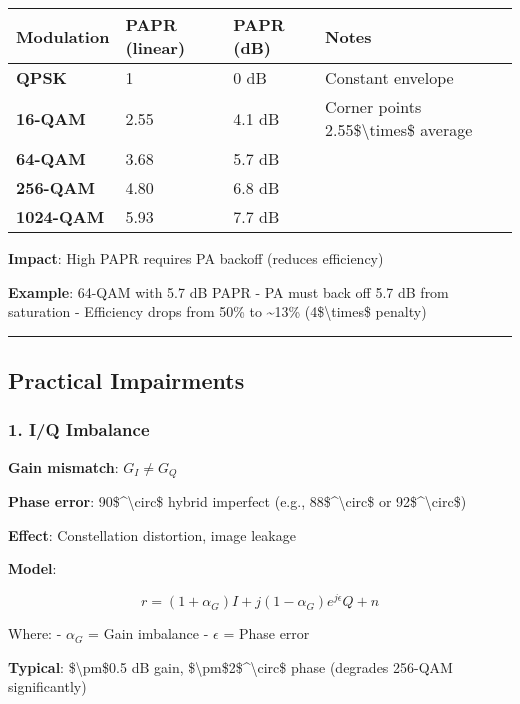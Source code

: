 {\def\LTcaptype{} %
\begin{longtable}[]{@{}llll@{}}
\toprule\noalign{}
Modulation & PAPR (linear) & PAPR (dB) & Notes \\
\midrule\noalign{}
\endhead
\bottomrule\noalign{}
\endlastfoot
\textbf{QPSK} & 1 & 0 dB & Constant envelope \\
\textbf{16-QAM} & 2.55 & 4.1 dB & Corner points
2.55\$\textbackslash times\$ average \\
\textbf{64-QAM} & 3.68 & 5.7 dB & \\
\textbf{256-QAM} & 4.80 & 6.8 dB & \\
\textbf{1024-QAM} & 5.93 & 7.7 dB & \\
\end{longtable}
}

\textbf{Impact}: High PAPR requires PA backoff (reduces efficiency)

\textbf{Example}: 64-QAM with 5.7 dB PAPR - PA must back off 5.7 dB from
saturation - Efficiency drops from 50\% to \textasciitilde13\%
(4\$\textbackslash times\$ penalty)

\begin{center}\rule{0.5\linewidth}{0.5pt}\end{center}

\subsection{Practical Impairments}\label{practical-impairments}

\subsubsection{1. I/Q Imbalance}\label{iq-imbalance}

\textbf{Gain mismatch}: \(G_I \neq G_Q\)

\textbf{Phase error}: 90\$\^{}\textbackslash circ\$ hybrid imperfect
(e.g., 88\$\^{}\textbackslash circ\$ or 92\$\^{}\textbackslash circ\$)

\textbf{Effect}: Constellation distortion, image leakage

\textbf{Model}:

\[
r = (1 + \alpha_G) I + j(1 - \alpha_G) e^{j\epsilon} Q + n
\]

Where: - \(\alpha_G\) = Gain imbalance - \(\epsilon\) = Phase error

\textbf{Typical}: \$\textbackslash pm\$0.5 dB gain,
\$\textbackslash pm\$2\$\^{}\textbackslash circ\$ phase (degrades
256-QAM significantly)

